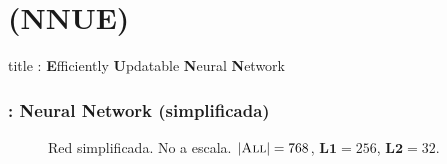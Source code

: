
\section{ (NNUE)}

\begin{frame}
\vfill
\centering
\begin{beamercolorbox}[sep=8pt,center,shadow=false,rounded=false]{title}
    : \textbf{E}fficiently \textbf{U}pdatable \textbf{N}eural \textbf{N}etwork
    \par%
\end{beamercolorbox}
\vfill
\end{frame}

\begin{frame}
\frametitle{: \textbf{N}eural \textbf{N}etwork (simplificada)}
\begin{figure}[H]
\centering
{}
\caption{Red simplificada. No a escala. $|\textsc{All}|=768$, $\bm{L1}=256$, $\bm{L2}=32$.}
\end{figure}
\end{frame}

